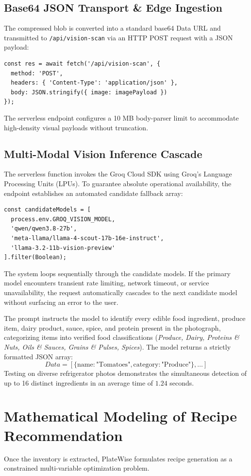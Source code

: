 \subsection*{Base64 JSON Transport \& Edge Ingestion}
The compressed blob is converted into a standard base64 Data URL and transmitted to \texttt{/api/vision-scan} via an HTTP POST request with a JSON payload:
\begin{lstlisting}
const res = await fetch('/api/vision-scan', {
  method: 'POST',
  headers: { 'Content-Type': 'application/json' },
  body: JSON.stringify({ image: imagePayload })
});
\end{lstlisting}
The serverless endpoint configures a 10 MB body-parser limit to accommodate high-density visual payloads without truncation.

\subsection*{Multi-Modal Vision Inference Cascade}
The serverless function invokes the Groq Cloud SDK using Groq's Language Processing Units (LPUs). To guarantee absolute operational availability, the endpoint establishes an automated candidate fallback array:
\begin{lstlisting}
const candidateModels = [
  process.env.GROQ_VISION_MODEL,
  'qwen/qwen3.8-27b',
  'meta-llama/llama-4-scout-17b-16e-instruct',
  'llama-3.2-11b-vision-preview'
].filter(Boolean);
\end{lstlisting}
The system loops sequentially through the candidate models. If the primary model encounters transient rate limiting, network timeout, or service unavailability, the request automatically cascades to the next candidate model without surfacing an error to the user.

The prompt instructs the model to identify every edible food ingredient, produce item, dairy product, sauce, spice, and protein present in the photograph, categorizing items into verified food classifications (\textit{Produce, Dairy, Proteins \& Nuts, Oils \& Sauces, Grains \& Pulses, Spices}). The model returns a strictly formatted JSON array:
\begin{equation}
Data = \left[ \{ \text{name}: \text{"Tomatoes"}, \text{category}: \text{"Produce"} \}, \ldots \right]
\end{equation}
Testing on diverse refrigerator photos demonstrates the simultaneous detection of up to 16 distinct ingredients in an average time of $1.24$ seconds.

\section{Mathematical Modeling of Recipe Recommendation}
Once the inventory is extracted, PlateWise formulates recipe generation as a constrained multi-variable optimization problem.


